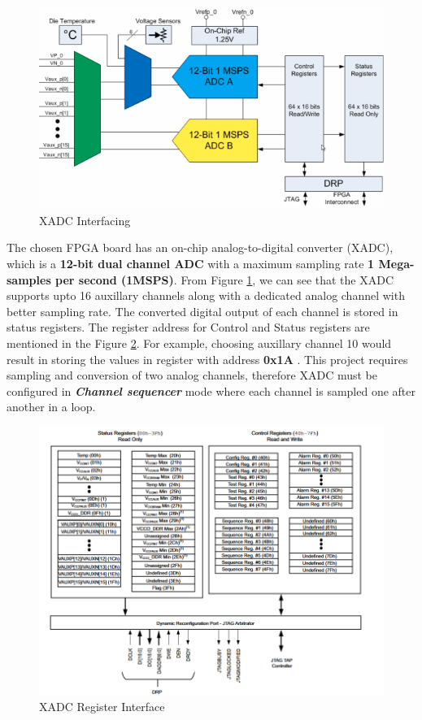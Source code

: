 \documentclass[BTech]{nitkdiss}
\begin{document}
\begin{figure}[h!]
    \centering
    \includegraphics[width = \textwidth]{XADC.png}
    \caption{XADC Interfacing}
    \label{fig:xadc}
\end{figure}
The chosen FPGA board has an on-chip analog-to-digital converter (XADC), which is a \textbf{12-bit dual channel ADC} with a maximum sampling rate \textbf{1 Mega-samples per second (1MSPS)}. From Figure \ref{fig:xadc}, we can see that the XADC supports upto 16 auxillary channels along with a dedicated analog channel with better sampling rate. The converted digital output of each channel is stored in status registers. The register address for Control and Status registers are mentioned in the Figure \ref{fig:xadcreg}. For example, choosing auxillary channel 10 would result in storing the values in register with address \textbf{0x1A} . This project requires sampling and conversion of two analog channels, therefore XADC must be configured in \textbf{\textit{Channel sequencer}} mode where each channel is sampled one after another in a loop.  
\begin{figure}[h!]
    \centering
    \includegraphics{XADC_Registers.png}
    \caption{XADC Register Interface}
    \label{fig:xadcreg}
\end{figure}
\end{document}
